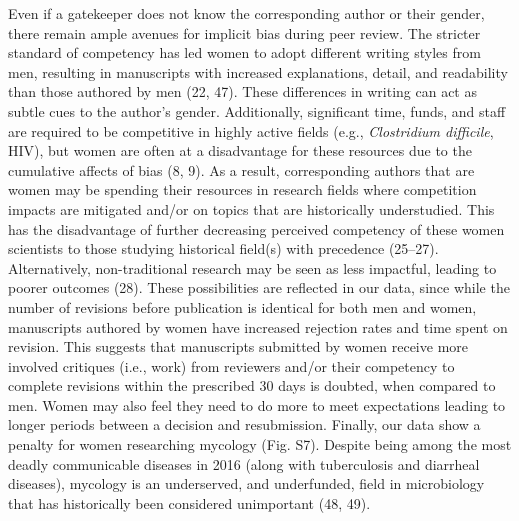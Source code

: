\documentclass[11pt,]{article}
\begin{document}
Even if a gatekeeper does not know the corresponding author or their
gender, there remain ample avenues for implicit bias during peer review.
The stricter standard of competency has led women to adopt different
writing styles from men, resulting in manuscripts with increased
explanations, detail, and readability than those authored by men (22,
47). These differences in writing can act as subtle cues to the author's
gender. Additionally, significant time, funds, and staff are required to
be competitive in highly active fields (e.g., \emph{Clostridium
difficile}, HIV), but women are often at a disadvantage for these
resources due to the cumulative affects of bias (8, 9). As a result,
corresponding authors that are women may be spending their resources in
research fields where competition impacts are mitigated and/or on topics
that are historically understudied. This has the disadvantage of further
decreasing perceived competency of these women scientists to those
studying historical field(s) with precedence (25--27). Alternatively,
non-traditional research may be seen as less impactful, leading to
poorer outcomes (28). These possibilities are reflected in our data,
since while the number of revisions before publication is identical for
both men and women, manuscripts authored by women have increased
rejection rates and time spent on revision. This suggests that
manuscripts submitted by women receive more involved critiques (i.e.,
work) from reviewers and/or their competency to complete revisions
within the prescribed 30 days is doubted, when compared to men. Women
may also feel they need to do more to meet expectations leading to
longer periods between a decision and resubmission. Finally, our data
show a penalty for women researching mycology (Fig. S7). Despite being
among the most deadly communicable diseases in 2016 (along with
tuberculosis and diarrheal diseases), mycology is an underserved, and
underfunded, field in microbiology that has historically been considered
unimportant (48, 49).
\end{document}

